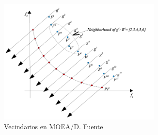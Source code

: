 \begin{figure}[H]
  \centering
  \includegraphics[width=0.73\textwidth]{figures/moead.png}
  \caption{Vecindarios en MOEA/D. Fuente \cite{moead_imagen}}
  \label{fig:moead}
\end{figure}

